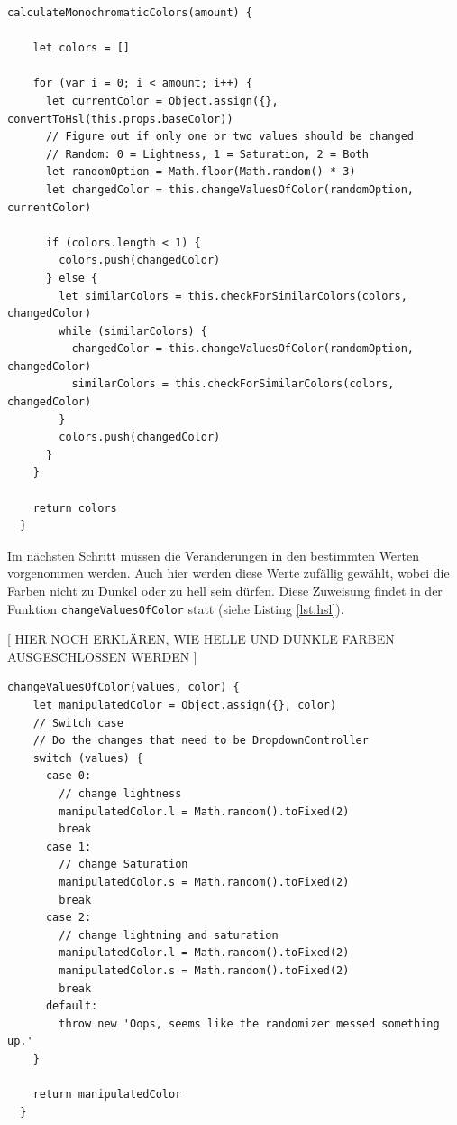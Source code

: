 \begin{lstlisting}[caption=Berechnung eines Monochromatischen Farbschemas, label=lst:mono]
  calculateMonochromaticColors(amount) {

    let colors = []

    for (var i = 0; i < amount; i++) {
      let currentColor = Object.assign({}, convertToHsl(this.props.baseColor))
      // Figure out if only one or two values should be changed
      // Random: 0 = Lightness, 1 = Saturation, 2 = Both
      let randomOption = Math.floor(Math.random() * 3)
      let changedColor = this.changeValuesOfColor(randomOption, currentColor)

      if (colors.length < 1) {
        colors.push(changedColor)
      } else {
        let similarColors = this.checkForSimilarColors(colors, changedColor)
        while (similarColors) {
          changedColor = this.changeValuesOfColor(randomOption, changedColor)
          similarColors = this.checkForSimilarColors(colors, changedColor)
        }
        colors.push(changedColor)
      }
    }

    return colors
  }
\end{lstlisting}

Im nächsten Schritt müssen die Veränderungen in den bestimmten Werten vorgenommen werden. Auch hier werden diese Werte zufällig gewählt, wobei die Farben nicht zu Dunkel oder zu hell sein dürfen. Diese Zuweisung findet in der Funktion \verb|changeValuesOfColor| statt (siehe Listing \ref{lst:hsl}).

[ HIER NOCH ERKLÄREN, WIE HELLE UND DUNKLE FARBEN AUSGESCHLOSSEN WERDEN ]

\begin{lstlisting}[caption=Setzen der HSL-Werte, label=lst:hsl]
  changeValuesOfColor(values, color) {
    let manipulatedColor = Object.assign({}, color)
    // Switch case
    // Do the changes that need to be DropdownController
    switch (values) {
      case 0:
        // change lightness
        manipulatedColor.l = Math.random().toFixed(2)
        break
      case 1:
        // change Saturation
        manipulatedColor.s = Math.random().toFixed(2)
        break
      case 2:
        // change lightning and saturation
        manipulatedColor.l = Math.random().toFixed(2)
        manipulatedColor.s = Math.random().toFixed(2)
        break
      default:
        throw new 'Oops, seems like the randomizer messed something up.'
    }

    return manipulatedColor
  }
\end{lstlisting}

